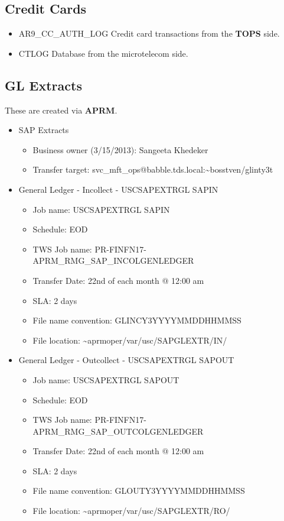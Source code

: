 \documentclass[12pt,twoside]{article}
\begin{document}
\subsection{Credit Cards}
\label{sec:orgheadline65}
\begin{itemize}
\item AR9\_CC\_AUTH\_LOG
      Credit card transactions from the \textbf{TOPS} side.
\item CTLOG
Database from the microtelecom side.
\end{itemize}

\subsection{GL Extracts}
\label{sec:orgheadline66}
These are created via \textbf{APRM}.
\small
\begin{itemize}
\item SAP Extracts
\begin{itemize}
\item Business owner (3/15/2013): Sangeeta Khedeker
\item Transfer target:
svc\_mft\_ops@babble.tds.local:\textasciitilde{}bosstven/glinty3t
\end{itemize}

\item General Ledger - Incollect - USCSAPEXTRGL SAPIN
\begin{itemize}
\item Job name: USCSAPEXTRGL SAPIN
\item Schedule: EOD
\item TWS Job name: PR-FINFN17-APRM\_RMG\_SAP\_INCOLGENLEDGER
\item Transfer Date: 22nd of each month @ 12:00 am
\item SLA: 2 days
\item File name convention: GLINCY3YYYYMMDDHHMMSS
\item File location: \textasciitilde{}aprmoper/var/usc/SAPGLEXTR/IN/
\end{itemize}

\item General Ledger - Outcollect - USCSAPEXTRGL SAPOUT
\begin{itemize}
\item Job name: USCSAPEXTRGL SAPOUT
\item Schedule: EOD
\item TWS Job name: PR-FINFN17-APRM\_RMG\_SAP\_OUTCOLGENLEDGER
\item Transfer Date: 22nd of each month @ 12:00 am
\item SLA: 2 days
\item File name convention: GLOUTY3YYYYMMDDHHMMSS
\item File location: \textasciitilde{}aprmoper/var/usc/SAPGLEXTR/RO/
\end{itemize}


\end{itemize}
\end{document}
